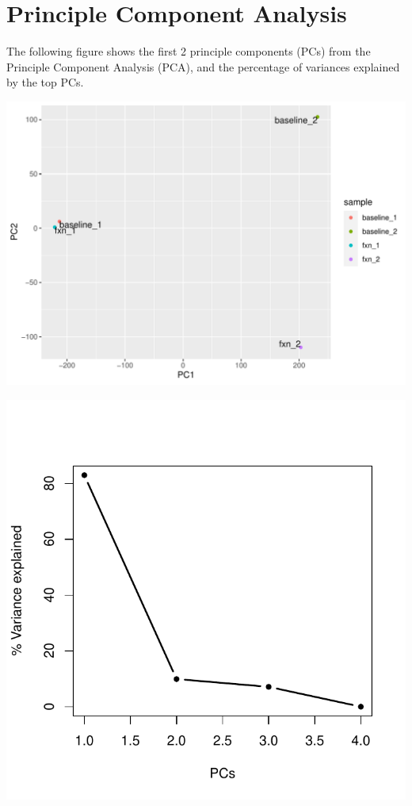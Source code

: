 \documentclass{article}
\begin{document}
\newpage\section{Principle Component Analysis}
The following figure shows the first 2 principle components (PCs) from the Principle Component Analysis (PCA), and the percentage of variances explained by the top PCs.



\includegraphics{count_20200409__countsummary-007}

\includegraphics{count_20200409__countsummary-008}
\end{document}
